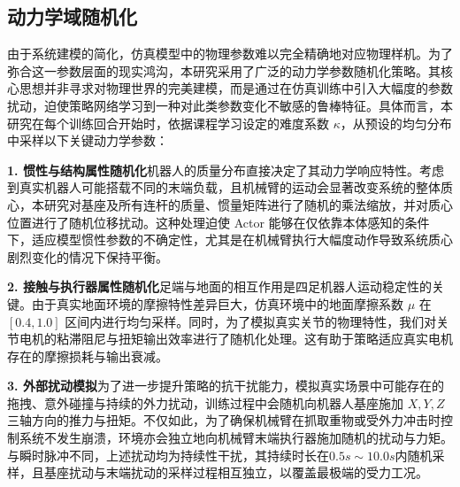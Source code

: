 \subsection{动力学域随机化}

由于系统建模的简化，仿真模型中的物理参数难以完全精确地对应物理样机。为了弥合这一参数层面的现实鸿沟，本研究采用了广泛的动力学参数随机化策略。其核心思想并非寻求对物理世界的完美建模，而是通过在仿真训练中引入大幅度的参数扰动，迫使策略网络学习到一种对此类参数变化不敏感的鲁棒特征。具体而言，本研究在每个训练回合开始时，依据课程学习设定的难度系数 $\kappa$，从预设的均匀分布中采样以下关键动力学参数：

\textbf{1. 惯性与结构属性随机化}机器人的质量分布直接决定了其动力学响应特性。考虑到真实机器人可能搭载不同的末端负载，且机械臂的运动会显著改变系统的整体质心，本研究对基座及所有连杆的质量、惯量矩阵进行了随机的乘法缩放，并对质心位置进行了随机位移扰动。这种处理迫使 Actor 能够在仅依靠本体感知的条件下，适应模型惯性参数的不确定性，尤其是在机械臂执行大幅度动作导致系统质心剧烈变化的情况下保持平衡。

\textbf{2. 接触与执行器属性随机化}足端与地面的相互作用是四足机器人运动稳定性的关键。由于真实地面环境的摩擦特性差异巨大，仿真环境中的地面摩擦系数 $\mu$ 在 $[0.4, 1.0]$ 区间内进行均匀采样。同时，为了模拟真实关节的物理特性，我们对关节电机的粘滞阻尼与扭矩输出效率进行了随机化处理。这有助于策略适应真实电机存在的摩擦损耗与输出衰减。

\textbf{3. 外部扰动模拟}为了进一步提升策略的抗干扰能力，模拟真实场景中可能存在的拖拽、意外碰撞与持续的外力扰动，训练过程中会随机向机器人基座施加 $X, Y, Z$ 三轴方向的推力与扭矩。不仅如此，为了确保机械臂在抓取重物或受外力冲击时控制系统不发生崩溃，环境亦会独立地向机械臂末端执行器施加随机的扰动与力矩。与瞬时脉冲不同，上述扰动均为持续性干扰，其持续时长在$0.5s \sim 10.0s$内随机采样，且基座扰动与末端扰动的采样过程相互独立，以覆盖最极端的受力工况。

